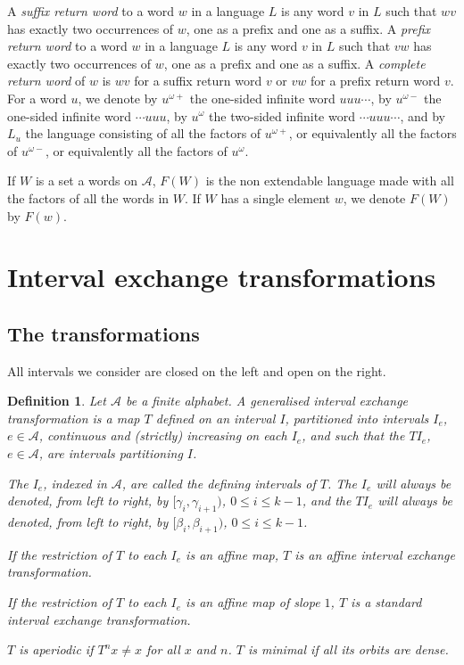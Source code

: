 \documentclass[12pt,a4paper]{amsart}
\newtheorem{definition}{Definition}
\begin{document}
 A {\it suffix return word} to a word $w$ in a language $L$ is any word $v$ in $L$ such that $wv$ has exactly two occurrences of $w$, one as a prefix and one as a suffix. A {\it prefix return word} to a word $w$ in a language $L$ is any word $v$ in $L$ such that $vw$ has exactly two occurrences of $w$, one as a prefix and one as a suffix. A {\it complete return word} of $w$ is $wv$ for a suffix return word $v$ or $vw$ for a prefix return word $v$.\\


For a word $u$, we denote by $u^{\omega+}$ the one-sided infinite word $uuu\cdots$, by $u^{\omega-}$ the one-sided infinite word $\cdots uuu$, by $u^{\omega}$ the two-sided infinite word $\cdots uuu\cdots$, and by $L_u$ the language consisting of all the factors of  $u^{\omega+}$, or equivalently all the factors of  $u^{\omega-}$, or equivalently all the factors of  $u^{\omega}$.

If $W$ is a set a words on $\mathcal A$, $F(W)$ is the non extendable language made with all the factors of all the  words in $W$. If $W$ has a single element $w$, we denote $F(W)$ by $F(w)$. 


\section{Interval exchange transformations}
\subsection{The transformations}
All intervals we consider are closed on the left and open on the right.

\begin{definition}\label{dit} Let $\mathcal A$ be a finite alphabet. A {\em generalised interval exchange transformation}  is  a map $T$ defined on an interval $I$, partitioned into intervals  $I_e$, $e \in  \mathcal A$, continuous and (strictly) increasing on each $I_e$,  and 
such that the $TI_e$, $e\in \mathcal A$, are  intervals partitioning $I$. 

The $I_e$, indexed in $\mathcal A$, are called the {\em defining intervals} of $T$. The $I_e$ will always be denoted, from left to right, by $[\gamma_i, \gamma_{i+1})$, $0\leq i\leq k-1$, and the  $TI_e$ will always be denoted, from left to right, by $[\beta_i, \beta_{i+1})$, $0\leq i\leq k-1$.

If the restriction of $T$ to each $I_e$ is an affine map, $T$ is an {\em affine} interval exchange transformation.

If the restriction of $T$ to each $I_e$ is an affine map of slope $1$, $T$ is a {\em standard} interval exchange transformation.

$T$ is {\em aperiodic} if $T^nx\neq x$ for all $x$ and $n$.  $T$ is {\em minimal} if all its orbits are dense. 
\end{definition}
\end{document}
